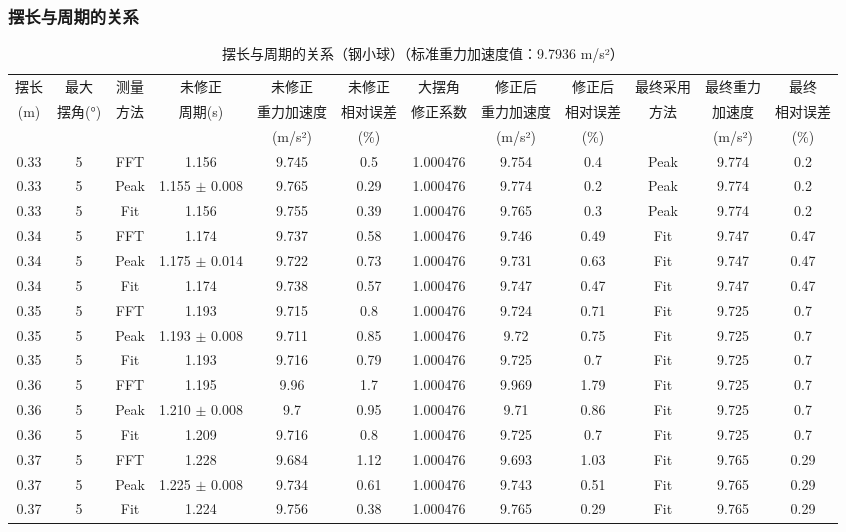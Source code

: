 \documentclass[lang=cn,a4paper,newtx,bibstyle=gb7714-2015]{elegantpaper}
\newcommand{\threelinetablestyle}{%
  \renewcommand{\arraystretch}{1.2}%
  \setlength{\tabcolsep}{3.5pt}%
  \small%
}
\numberwithin{equation}{section} %
\begin{document}
\subsubsection{摆长与周期的关系}
\begin{table}[H]
\centering
\threelinetablestyle
\caption{摆长与周期的关系（钢小球）（标准重力加速度值：9.7936 m/s²）}
\setlength{\tabcolsep}{2pt}
\footnotesize
\begin{tabular}{cccccccccccc}
\toprule
摆长 & 最大 & 测量 & 未修正 & 未修正 & 未修正 & 大摆角 & 修正后 & 修正后 & 最终采用 & 最终重力 & 最终 \\
(m) & 摆角(°) & 方法 & 周期(s) & 重力加速度 & 相对误差 & 修正系数 & 重力加速度 & 相对误差 & 方法 & 加速度 & 相对误差 \\
 & & & & (m/s²) & (\%) & & (m/s²) & (\%) & & (m/s²) & (\%) \\
\midrule
0.33 & 5 & FFT & 1.156 & 9.745 & 0.5 & 1.000476 & 9.754 & 0.4 & Peak & 9.774 & 0.2 \\
0.33 & 5 & Peak & 1.155 $\pm$ 0.008 & 9.765 & 0.29 & 1.000476 & 9.774 & 0.2 & Peak & 9.774 & 0.2 \\
0.33 & 5 & Fit & 1.156 & 9.755 & 0.39 & 1.000476 & 9.765 & 0.3 & Peak & 9.774 & 0.2 \\
0.34 & 5 & FFT & 1.174 & 9.737 & 0.58 & 1.000476 & 9.746 & 0.49 & Fit & 9.747 & 0.47 \\
0.34 & 5 & Peak & 1.175 $\pm$ 0.014 & 9.722 & 0.73 & 1.000476 & 9.731 & 0.63 & Fit & 9.747 & 0.47 \\
0.34 & 5 & Fit & 1.174 & 9.738 & 0.57 & 1.000476 & 9.747 & 0.47 & Fit & 9.747 & 0.47 \\
0.35 & 5 & FFT & 1.193 & 9.715 & 0.8 & 1.000476 & 9.724 & 0.71 & Fit & 9.725 & 0.7 \\
0.35 & 5 & Peak & 1.193 $\pm$ 0.008 & 9.711 & 0.85 & 1.000476 & 9.72 & 0.75 & Fit & 9.725 & 0.7 \\
0.35 & 5 & Fit & 1.193 & 9.716 & 0.79 & 1.000476 & 9.725 & 0.7 & Fit & 9.725 & 0.7 \\
0.36 & 5 & FFT & 1.195 & 9.96 & 1.7 & 1.000476 & 9.969 & 1.79 & Fit & 9.725 & 0.7 \\
0.36 & 5 & Peak & 1.210 $\pm$ 0.008 & 9.7 & 0.95 & 1.000476 & 9.71 & 0.86 & Fit & 9.725 & 0.7 \\
0.36 & 5 & Fit & 1.209 & 9.716 & 0.8 & 1.000476 & 9.725 & 0.7 & Fit & 9.725 & 0.7 \\
0.37 & 5 & FFT & 1.228 & 9.684 & 1.12 & 1.000476 & 9.693 & 1.03 & Fit & 9.765 & 0.29 \\
0.37 & 5 & Peak & 1.225 $\pm$ 0.008 & 9.734 & 0.61 & 1.000476 & 9.743 & 0.51 & Fit & 9.765 & 0.29 \\
0.37 & 5 & Fit & 1.224 & 9.756 & 0.38 & 1.000476 & 9.765 & 0.29 & Fit & 9.765 & 0.29 \\
\bottomrule
\end{tabular}
\label{tab:length_and_period}
\end{table}
\label{app:length_and_period}
\end{document}
